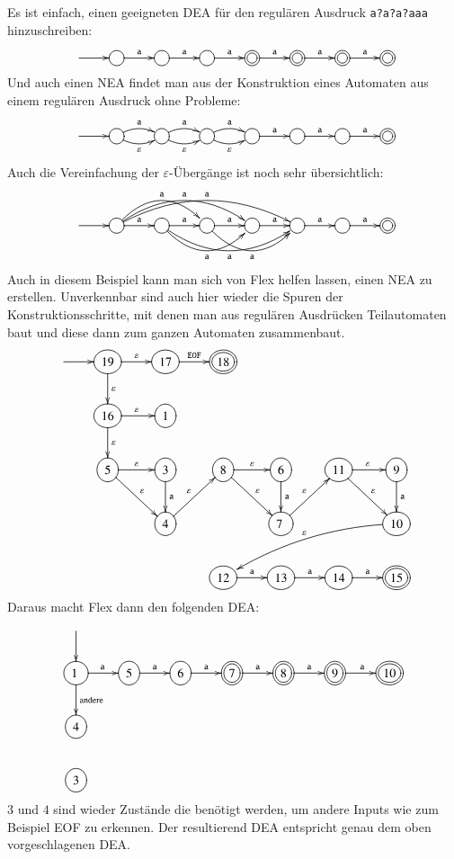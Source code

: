 Es ist einfach, einen geeigneten DEA für den regulären
Ausdruck {\tt a?a?a?aaa} hinzuschreiben:
\[
\entrymodifiers={++[o][F]}
\xymatrix{
*+\txt{}\ar[r]
	&\ar[r]^{\tt a}
		&\ar[r]^{\tt a}
			&\ar[r]^{\tt a}
				&*++[o][F=]{}\ar[r]^{\tt a}
					&*++[o][F=]{}\ar[r]^{\tt a}
						&*++[o][F=]{}\ar[r]^{\tt a}
							&*++[o][F=]{}
}
\]
Und auch einen NEA findet man aus der Konstruktion eines Automaten
aus einem regulären Ausdruck ohne Probleme:
\[
\entrymodifiers={++[o][F]}
\xymatrix{
*+\txt{}\ar[r]
	&\ar@/^/[r]^{\tt a} \ar@/_/[r]_{\varepsilon}
		&\ar@/^/[r]^{\tt a} \ar@/_/[r]_{\varepsilon}
			&\ar@/^/[r]^{\tt a} \ar@/_/[r]_{\varepsilon}
				&\ar[r]^{\tt a}
					&\ar[r]^{\tt a}
						&\ar[r]^{\tt a}
							&*++[o][F=]{}
}
\]
Auch die Vereinfachung der $\varepsilon$-Übergänge ist noch sehr
übersichtlich:
\[
\entrymodifiers={++[o][F]}
\xymatrix{
*+\txt{}\ar[r]
	&\ar[r]^{\tt a}
	\ar@/^20pt/[rr]^{\tt a}
	\ar@/^20pt/[rrr]^{\tt a}
	\ar@/^20pt/[rrrr]^{\tt a}
		&\ar[r]^{\tt a}
		\ar@/_20pt/[rr]_{\tt a}
		\ar@/_20pt/[rrr]_{\tt a}
			&\ar[r]^{\tt a} \ar@/_20pt/[rr]_{\tt a}
				&\ar[r]^{\tt a}
					&\ar[r]^{\tt a}
						&\ar[r]^{\tt a}
							&*++[o][F=]{}
}
\]
Auch in diesem Beispiel kann man sich von Flex helfen lassen,
einen NEA zu erstellen.
Unverkennbar sind auch hier wieder die
Spuren der Konstruktionsschritte, mit denen man aus regulären
Ausdrücken Teilautomaten baut und diese dann zum ganzen Automaten
zusammenbaut.
\[
\entrymodifiers={++[o][F]}
\xymatrix{
*+\txt{}\ar[r]
	&{19}\ar[d]^{\varepsilon}\ar[r]^{\varepsilon}
		&{17}\ar[r]^{\tt EOF}
			&*++[o][F=]{18}
\\
*+\txt{}
	&{16}\ar[d]^{\varepsilon} \ar[r]^{\varepsilon}
		&{1}
\\
*+\txt{}
	&{5} \ar[r]^{\varepsilon}
	      \ar[dr]^{\varepsilon}
		&{3} \ar[d]^{\tt a}
			&{8} \ar[r]^{\varepsilon}
			     \ar[dr]^{\varepsilon}
				&{6} \ar[d]^{\tt a}
					&{11} \ar[r]^{\varepsilon}
					     \ar[dr]^{\varepsilon}
						&{9} \ar[d]^{\tt a}
\\
*+\txt{}
	&*+\txt{}
		&{4} \ar[ur]^{\varepsilon}
			&*+\txt{}
				&{7} \ar[ur]^{\varepsilon}
					&*+\txt{}
						&{10} \ar@/_10pt/[dlll]_{\varepsilon}
\\
*+\txt{}
	&*+\txt{}
		&*+\txt{}
			&{12} \ar[r]^{\tt a}
				&{13} \ar[r]^{\tt a}
					&{14} \ar[r]^{\tt a}
						&*++[o][F=]{15}
}
\]
Daraus macht Flex dann den folgenden DEA:
\[
\entrymodifiers={++[o][F]}
\xymatrix{
*+\txt{}\ar[d]
\\
{1}\ar[r]^{\tt a} \ar[d]^{\text{andere}} \
	&{5}\ar[r]^{\tt a}
		&{6}\ar[r]^{\tt a}
			&*++[o][F=]{7} \ar[r]^{\tt a}
				&*++[o][F=]{8} \ar[r]^{\tt a}
					&*++[o][F=]{9} \ar[r]^{\tt a}
						&*++[o][F=]{10}
\\
{4}
\\
{3}
}
\]
$3$ und $4$ sind wieder Zustände die benötigt werden, um andere Inputs
wie zum Beispiel EOF zu erkennen.
Der resultierend DEA entspricht genau
dem oben vorgeschlagenen DEA.

